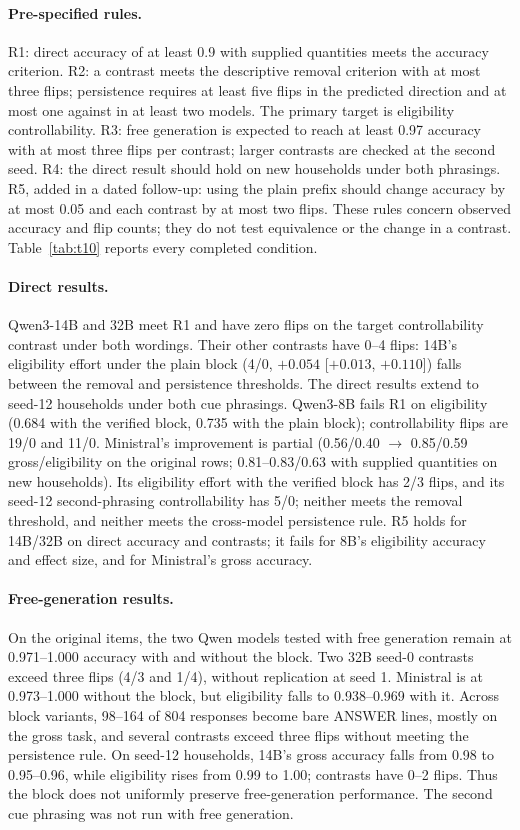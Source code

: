 \documentclass[11pt]{article}
\begin{document}
\paragraph{Pre-specified rules.} R1: direct accuracy of at least 0.9 with supplied quantities meets the accuracy criterion. R2: a contrast meets the descriptive removal criterion with at most three flips; persistence requires at least five flips in the predicted direction and at most one against in at least two models. The primary target is eligibility controllability. R3: free generation is expected to reach at least 0.97 accuracy with at most three flips per contrast; larger contrasts are checked at the second seed. R4: the direct result should hold on new households under both phrasings. R5, added in a dated follow-up: using the plain prefix should change accuracy by at most 0.05 and each contrast by at most two flips. These rules concern observed accuracy and flip counts; they do not test equivalence or the change in a contrast. Table~\ref{tab:t10} reports every completed condition.

\paragraph{Direct results.} Qwen3-14B and 32B meet R1 and have zero flips on the target controllability contrast under both wordings. Their other contrasts have 0--4 flips: 14B's eligibility effort under the plain block (4/0, $+0.054$ [$+0.013$, $+0.110$]) falls between the removal and persistence thresholds. The direct results extend to seed-12 households under both cue phrasings. Qwen3-8B fails R1 on eligibility (0.684 with the verified block, 0.735 with the plain block); controllability flips are 19/0 and 11/0. Ministral's improvement is partial (0.56/0.40 $\to$ 0.85/0.59 gross/eligibility on the original rows; 0.81--0.83/0.63 with supplied quantities on new households). Its eligibility effort with the verified block has 2/3 flips, and its seed-12 second-phrasing controllability has 5/0; neither meets the removal threshold, and neither meets the cross-model persistence rule. R5 holds for 14B/32B on direct accuracy and contrasts; it fails for 8B's eligibility accuracy and effect size, and for Ministral's gross accuracy.

\paragraph{Free-generation results.} On the original items, the two Qwen models tested with free generation remain at 0.971--1.000 accuracy with and without the block. Two 32B seed-0 contrasts exceed three flips (4/3 and 1/4), without replication at seed 1. Ministral is at 0.973--1.000 without the block, but eligibility falls to 0.938--0.969 with it. Across block variants, 98--164 of 804 responses become bare ANSWER lines, mostly on the gross task, and several contrasts exceed three flips without meeting the persistence rule. On seed-12 households, 14B's gross accuracy falls from 0.98 to 0.95--0.96, while eligibility rises from 0.99 to 1.00; contrasts have 0--2 flips. Thus the block does not uniformly preserve free-generation performance. The second cue phrasing was not run with free generation.
\end{document}

